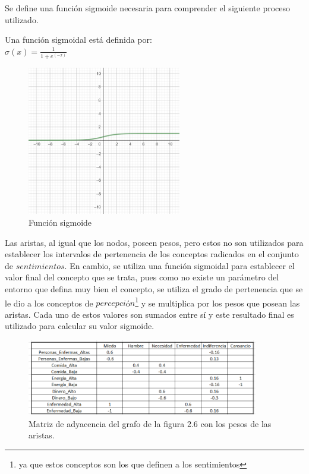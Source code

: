 Se define una función sigmoide necesaria para comprender el siguiente proceso utilizado.\autocite{Saeed2021}
\begin{center}
    Una función sigmoidal está definida por:\\
    $\sigma(x)= \frac{1}{1+e^(-x)}$
\end{center}

\begin{figure}[htb]
    \centering
    \includegraphics[width=0.6\textwidth]{Graphics/Sigmoidal.png}
    \caption{Función sigmoide}
\end{figure}
Las aristas, al igual que los nodos, poseen pesos, pero estos no son utilizados para establecer los intervalos
de pertenencia de los conceptos radicados en el conjunto de $sentimientos$. En cambio, se utiliza una función 
sigmoidal para establecer el valor final del concepto que se trata, pues como no existe un parámetro del 
entorno que defina muy bien el concepto, se utiliza el grado de pertenencia que se le dio a los conceptos
de $percepci$ó$n$\footnote{ya que estos conceptos son los que definen a los sentimientos} y se multiplica por los pesos 
que posean las aristas. Cada uno de estos valores son sumados entre sí y este resultado final es utilizado 
para calcular su valor sigmoide.

\begin{figure}[htb]
    \centering
    \includegraphics[width=0.9\textwidth]{Graphics/Pesos_Perc_Sent.png}
    \caption{Matriz de adyacencia del grafo de la figura 2.6 con los pesos de las aristas.}
\end{figure}

